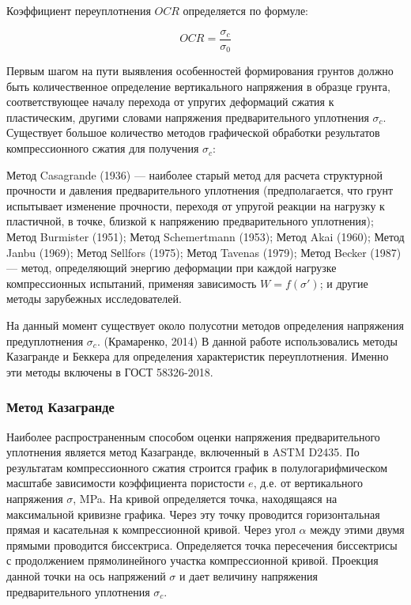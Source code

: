 Коэффициент переуплотнения $OCR$ определяется по формуле:

\[
   OCR = \frac{\sigma_c}{\sigma_0}
\]

Первым шагом на пути выявления особенностей формирования грунтов должно быть количественное определение
вертикального напряжения в образце грунта, соответствующее началу перехода от упругих деформаций сжатия к пластическим,
другими словами напряжения предварительного уплотнения $\sigma_c$. 
Существует большое количество методов графической обработки 
результатов компрессионного сжатия для получения $\sigma_c$:

Метод Casagrande (1936) --- наиболее старый метод для расчета структурной 
прочности и давления предварительного уплотнения (предполагается, 
что грунт испытывает изменение прочности, переходя от упругой реакции на нагрузку 
к пластичной, в точке, близкой к напряжению предварительного уплотнения);
Метод Burmister (1951); Метод Schemertmann (1953); Метод Akai (1960);
Метод Janbu (1969); Метод Sеllfors (1975); Метод Tavenas (1979);
Метод Becker (1987) --- метод, определяющий энергию деформации
при каждой нагрузке компрессионных испытаний, применяя зависимость
\(W = f(\sigma')\); и другие методы зарубежных исследователей.
 
На данный момент существует около полусотни методов определения напряжения
предуплотнения $\sigma_c$. (Крамаренко, 2014)
В данной работе использовались методы Казагранде и Беккера для определения характеристик 
переуплотнения. Именно эти методы включены в ГОСТ 58326-2018.

\subsubsection{Метод Казагранде}

Наиболее распространенным способом оценки напряжения предварительного 
уплотнения является метод Казагранде, включенный в ASTM D2435. 
По результатам компрессионного сжатия строится график в полулогарифмическом 
масштабе зависимости коэффициента пористости $e$, д.е. от вертикального напряжения $\sigma$, \si{\mega\pascal}. 
На кривой определяется точка, находящаяся на максимальной кривизне 
графика. Через эту точку проводится горизонтальная прямая и касательная к компрессионной кривой. 
Через угол $\alpha$ между этими двумя прямыми проводится биссектриса. 
Определяется точка пересечения биссектрисы с продолжением прямолинейного 
участка компрессионной кривой. Проекция данной точки на ось напряжений $\sigma$
и дает величину напряжения предварительного уплотнения $\sigma_c$.

